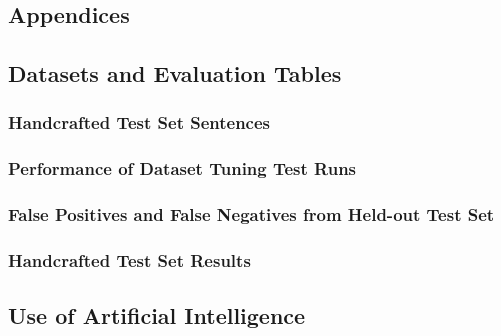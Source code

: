 \appendix

\begin{appendices}
\chapter*{Appendices}

\renewcommand{\thesection}{\Alph{section}}





\section{Datasets and Evaluation Tables}\label{appendix:datasets}

\subsection{Handcrafted Test Set Sentences}
\label{tab:handcrafted_testset}


\subsection{Performance of Dataset Tuning Test Runs}
\label{appendix:dataset_tuning_table}


\subsection{False Positives and False Negatives from Held-out Test Set}
\label{tab:fp_fn_table}


\subsection{Handcrafted Test Set Results}
\label{tab:handcrafted_testset_results}



\section{Use of Artificial Intelligence}\label{appendix:artificial_intelligece}


\end{appendices}
